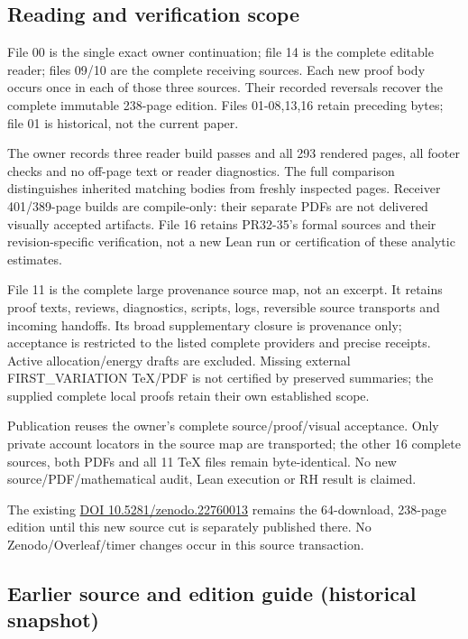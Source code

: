 \documentclass[
]{article}
\begin{document}
\subsection{Reading and verification
scope}\label{reading-and-verification-scope-1}

File 00 is the single exact owner continuation; file 14 is the complete
editable reader; files 09/10 are the complete receiving sources. Each
new proof body occurs once in each of those three sources. Their
recorded reversals recover the complete immutable 238-page edition.
Files 01-08,13,16 retain preceding bytes; file 01 is historical, not the
current paper.

The owner records three reader build passes and all 293 rendered pages,
all footer checks and no off-page text or reader diagnostics. The full
comparison distinguishes inherited matching bodies from freshly
inspected pages. Receiver 401/389-page builds are compile-only: their
separate PDFs are not delivered visually accepted artifacts. File 16
retains PR32-35's formal sources and their revision-specific
verification, not a new Lean run or certification of these analytic
estimates.

File 11 is the complete large provenance source map, not an excerpt. It
retains proof texts, reviews, diagnostics, scripts, logs, reversible
source transports and incoming handoffs. Its broad supplementary closure
is provenance only; acceptance is restricted to the listed complete
providers and precise receipts. Active allocation/energy drafts are
excluded. Missing external FIRST\_VARIATION TeX/PDF is not certified by
preserved summaries; the supplied complete local proofs retain their own
established scope.

Publication reuses the owner's complete source/proof/visual acceptance.
Only private account locators in the source map are transported; the
other 16 complete sources, both PDFs and all 11 TeX files remain
byte-identical. No new source/PDF/mathematical audit, Lean execution or
RH result is claimed.

The existing \href{https://doi.org/10.5281/zenodo.22760013}{DOI
10.5281/zenodo.22760013} remains the 64-download, 238-page edition until
this new source cut is separately published there. No
Zenodo/Overleaf/timer changes occur in this source transaction.

\subsection{Earlier source and edition guide (historical
snapshot)}\label{earlier-source-and-edition-guide-historical-snapshot-4}
\end{document}

